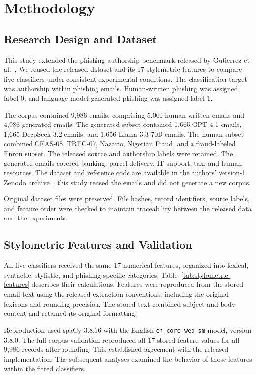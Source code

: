 \documentclass[conference]{IEEEtran}
\begin{document}
\section{Methodology}
\label{sec:methodology}

\subsection{Research Design and Dataset}

This study extended the phishing authorship benchmark released by
Gutierrez et al.~\cite{gutierrez2026}. We reused the released dataset
and its 17 stylometric features to compare five classifiers under
consistent experimental conditions. The classification target was
authorship within phishing emails. Human-written phishing was
assigned label 0, and language-model-generated phishing was assigned
label 1.

The corpus contained 9,986 emails, comprising 5,000 human-written
emails and 4,986 generated emails. The generated subset contained
1,665 GPT-4.1 emails, 1,665 DeepSeek 3.2 emails, and 1,656
Llama 3.3 70B emails. The human subset combined CEAS-08,
TREC-07, Nazario, Nigerian Fraud, and a fraud-labeled Enron subset.
The released source and authorship labels were retained. The
generated emails covered banking, parcel delivery, IT support,
tax, and human resources. The dataset and reference code are
available in the authors' version-1 Zenodo
archive~\cite{gutierrezdataset2026}; this study reused the emails
and did not generate a new corpus.

Original dataset files were preserved. File hashes, record
identifiers, source labels, and feature order were checked to
maintain traceability between the released data and the experiments.

\subsection{Stylometric Features and Validation}

All five classifiers received the same 17 numerical features,
organized into lexical, syntactic, stylistic, and phishing-specific
categories. Table~\ref{tab:stylometric-features} describes their
calculations. Features were reproduced from the stored email text
using the released extraction conventions, including the original
lexicons and rounding precision. The stored text combined subject
and body content and retained its original formatting.

Reproduction used spaCy 3.8.16 with the English
\texttt{en\_core\_web\_sm} model, version 3.8.0. The full-corpus
validation reproduced all 17 stored feature values for all 9,986
records after rounding. This established agreement with the released
implementation. The subsequent analyses examined the behavior
of those features within the fitted classifiers.
\end{document}
